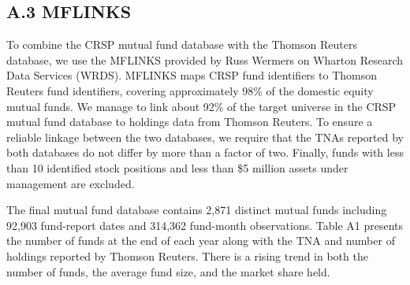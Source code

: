 \subsection*{A.3 \hspace{0.1cm} MFLINKS}
\par To combine the CRSP mutual fund database with the Thomson Reuters database, we use the MFLINKS provided by Russ Wermers on Wharton Research Data Services (WRDS). MFLINKS maps CRSP fund identifiers to Thomson Reuters fund identifiers, covering approximately 98\% of the domestic equity mutual funds. We manage to link about 92\% of the target universe in the CRSP mutual fund database to holdings data from Thomson Reuters. To ensure a reliable linkage between the two databases, we require that the TNAs reported by both databases do not differ by more than a factor of two. Finally, funds with less than 10 identified stock positions and less than \$5 million assets under management are excluded.  

\par The final mutual fund database contains 2,871 distinct mutual funds including 92,903 fund-report dates and 314,362 fund-month observations. Table A1 presents the number of funds at the end of each year along with the TNA and number of holdings reported by Thomson Reuters. There is a rising trend in both the number of funds, the average fund size, and the market share held.

